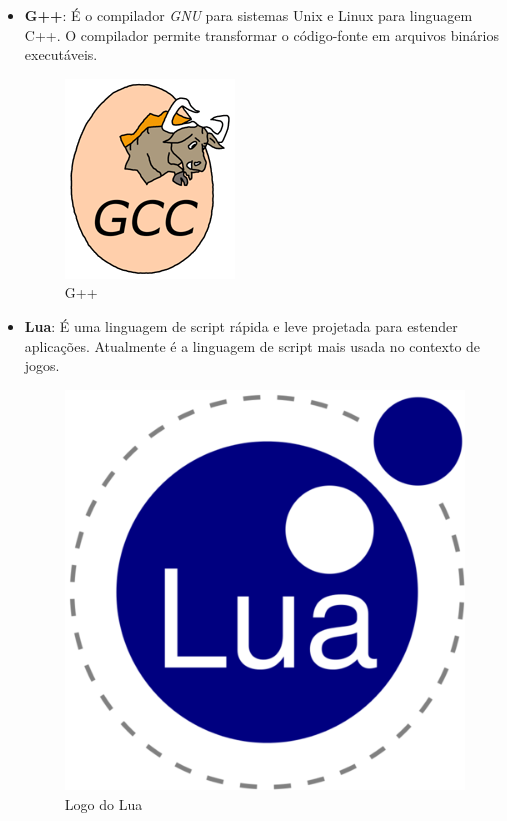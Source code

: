 \documentclass[11pt]{article} %
\begin{document}
\begin{itemize}
\item \textbf{G++}: É o compilador \textit{GNU} para sistemas Unix e Linux para linguagem C++. O compilador permite transformar o código-fonte em arquivos binários executáveis.

\begin{figure}[!htp]
\centering
\includegraphics[scale=0.4]{pictures/GCC.png}
\caption{G++}
\label{Logo do G++}
\end{figure}

\item \textbf{Lua}: É uma linguagem de script rápida e leve projetada para estender aplicações. Atualmente é a linguagem de script mais usada no contexto de jogos.

\begin{figure}[!htp]
\centering
\includegraphics[scale=0.2]{pictures/lua.png}
\caption{Logo do Lua}
\label{Logo do Lua}
\end{figure}


\end{itemize}
\end{document}
